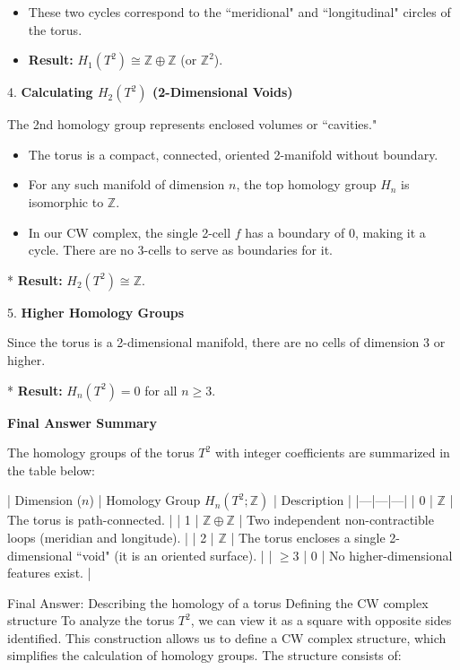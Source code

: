 \documentclass[12pt,a4paper]{report}
\begin{document}
\begin{description}
\begin{description}
\begin{description}
\begin{itemize}
\item  These two cycles correspond to the ``meridional" and ``longitudinal" circles of the torus.

\item  \textbf{Result:} $H_1(T^2) \cong \mathbb{Z} \oplus \mathbb{Z}$ (or $\mathbb{Z}^2$).
\end{itemize}

\item 4. \textbf{Calculating $H_2(T^2)$ (2-Dimensional Voids)}

The 2nd homology group represents enclosed volumes or ``cavities." 

\begin{itemize}
\item   The torus is a compact, connected, oriented 2-manifold without boundary.
\item   For any such manifold of dimension $n$, the top homology group $H_n$ is isomorphic to $\mathbb{Z}$.
\item   In our CW complex, the single 2-cell $f$ has a boundary of 0, making it a cycle. There are no 3-cells to serve as boundaries for it.
\end{itemize}
*   \textbf{Result:} $H_2(T^2) \cong \mathbb{Z}$.

\item 5. \textbf{Higher Homology Groups}

Since the torus is a 2-dimensional manifold, there are no cells of dimension 3 or higher.

*   \textbf{Result:} $H_n(T^2) = 0$ for all $n \ge 3$.

\end{description}
\item \textbf{Final Answer Summary}

The homology groups of the torus $T^2$ with integer coefficients are summarized in the table below:

| Dimension ($n$) | Homology Group $H_n(T^2; \mathbb{Z})$ | Description |
|---|---|---|
| 0 | $\mathbb{Z}$ | The torus is path-connected. |
| 1 | $\mathbb{Z} \oplus \mathbb{Z}$ | Two independent non-contractible loops (meridian and longitude). |
| 2 | $\mathbb{Z}$ | The torus encloses a single 2-dimensional ``void" (it is an oriented surface). |
| $\ge 3$ | $0$ | No higher-dimensional features exist. |

\end{description}
Final Answer:
Describing the homology of a torus
Defining the CW complex structure
To analyze the torus $T^2$, we can view it as a square with opposite sides identified. This construction allows us to define a CW complex structure, which simplifies the calculation of homology groups. The structure consists of:


\end{description}
\end{document}
